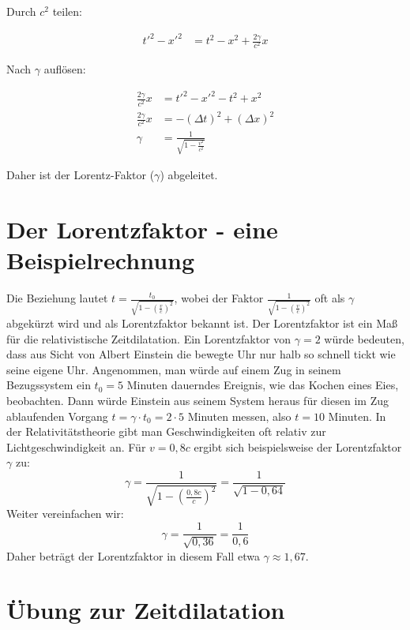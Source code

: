 \documentclass[a4paper]{report}
\begin{document}
\begin{flushleft}
	Durch \( c^2 \) teilen:
\end{flushleft}

\begin{align*}
t'^2 - x'^2 &= t^2 - x^2 + \frac{2\gamma}{c^2} x
\end{align*}

\begin{flushleft}
	Nach \( \gamma \) auflösen:
\end{flushleft}

\begin{align*}
\frac{2\gamma}{c^2} x &= t'^2 - x'^2 - t^2 + x^2 \\
\frac{2\gamma}{c^2} x &= -(\Delta t)^2 + (\Delta x)^2 \\
\gamma &= \frac{1}{\sqrt{1 - \frac{v^2}{c^2}}}
\end{align*}

\begin{flushleft}
	Daher ist der Lorentz-Faktor (\( \gamma \)) abgeleitet.
\end{flushleft}
\section{Der Lorentzfaktor - eine Beispielrechnung}

Die Beziehung lautet \( t = \frac{t_0}{\sqrt{1 - \left(\frac{v}{c}\right)^2}} \), wobei der Faktor \( \frac{1}{\sqrt{1 - \left(\frac{v}{c}\right)^2}} \) oft als \( \gamma \) abgekürzt wird und als Lorentzfaktor bekannt ist.
Der Lorentzfaktor ist ein Maß für die relativistische Zeitdilatation. Ein Lorentzfaktor von \( \gamma = 2 \) würde bedeuten, dass aus Sicht von Albert Einstein die bewegte Uhr nur halb so schnell tickt wie seine eigene Uhr.
Angenommen, man würde auf einem Zug in seinem Bezugssystem ein \( t_0 = 5 \) Minuten dauerndes Ereignis, wie das Kochen eines Eies, beobachten. Dann würde Einstein aus seinem System heraus für diesen im Zug ablaufenden Vorgang \( t = \gamma \cdot t_0 = 2 \cdot 5 \) Minuten messen, also \( t = 10 \) Minuten.
In der Relativitätstheorie gibt man Geschwindigkeiten oft relativ zur Lichtgeschwindigkeit an. Für \( v = 0,8c \) ergibt sich beispielsweise der Lorentzfaktor \( \gamma \) zu:
\[ \gamma = \frac{1}{\sqrt{1 - \left(\frac{0,8c}{c}\right)^2}} = \frac{1}{\sqrt{1 - 0,64}} \]
Weiter vereinfachen wir:
\[ \gamma = \frac{1}{\sqrt{0,36}} = \frac{1}{0,6} \]
Daher beträgt der Lorentzfaktor in diesem Fall etwa \( \gamma \approx 1,67 \).
\section{Übung zur Zeitdilatation}
\end{document}
